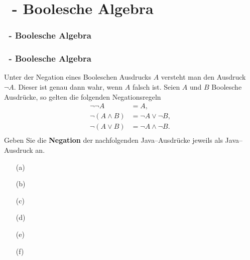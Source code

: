 \def\stitle{\theexercise\ - Boolesche Algebra}
\section{\stitle}
\begin{frame}
    \frametitle{\stitle}
\tableofcontents[current]    
\end{frame}

\begin{frame}[t]%
  \frametitle{\stitle}

Unter der Negation eines Booleschen Ausdrucks $A$ versteht man den Ausdruck $\neg A$. Dieser ist genau dann wahr, wenn $A$ falsch ist. Seien $A$ und $B$ Boolesche Ausdrücke, so gelten die folgenden Negationsregeln
\begin{align*}
\neg \neg A &= A,\\
\neg (A \wedge B) &= \neg A \vee \neg B,\\
\neg (A \vee B)   &= \neg A \wedge \neg B. \\
\end{align*}
Geben Sie die \textbf{Negation} der nachfolgenden Java--Ausdrücke jeweils als Java--Ausdruck an.

\begin{center}
\begin{minipage}{0.4\textwidth}
\begin{itemize}
\item[(a)] 
\item[(b)] 
\item[(c)] 
\end{itemize}
\end{minipage}
\quad
\begin{minipage}{0.5\textwidth}
\begin{itemize}
\item[(d)] 
\item[(e)] 
\item[(f)] 
\end{itemize}
\end{minipage}
\end{center}

\end{frame}


